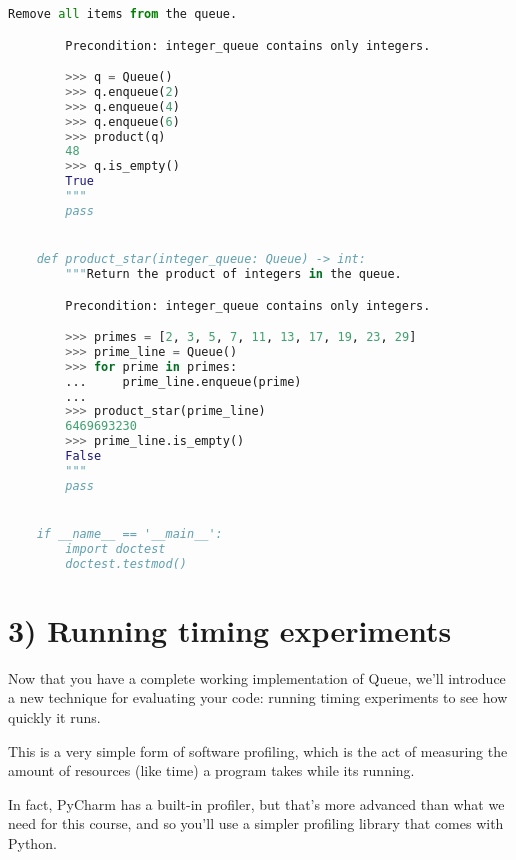 \documentclass[12pt]{article}
\begin{document}
\begin{lstlisting}[language=Python,caption={myqueue.py},captionpos=b]
        Remove all items from the queue.

        Precondition: integer_queue contains only integers.

        >>> q = Queue()
        >>> q.enqueue(2)
        >>> q.enqueue(4)
        >>> q.enqueue(6)
        >>> product(q)
        48
        >>> q.is_empty()
        True
        """
        pass


    def product_star(integer_queue: Queue) -> int:
        """Return the product of integers in the queue.

        Precondition: integer_queue contains only integers.

        >>> primes = [2, 3, 5, 7, 11, 13, 17, 19, 23, 29]
        >>> prime_line = Queue()
        >>> for prime in primes:
        ...     prime_line.enqueue(prime)
        ...
        >>> product_star(prime_line)
        6469693230
        >>> prime_line.is_empty()
        False
        """
        pass


    if __name__ == '__main__':
        import doctest
        doctest.testmod()


\end{lstlisting}

\section*{3) Running timing experiments}

Now that you have a complete working implementation of Queue, we’ll introduce a
new technique for evaluating your code: running timing experiments to see how
quickly it runs.

\bigskip

\noindent This is a very simple form of software profiling, which is the act of
measuring the amount of resources (like time) a program takes while its running.

\bigskip

\noindent In fact, PyCharm has a built-in profiler, but that’s more advanced than what we
need for this course, and so you’ll use a simpler profiling library that comes
with Python.

\bigskip
\end{document}
